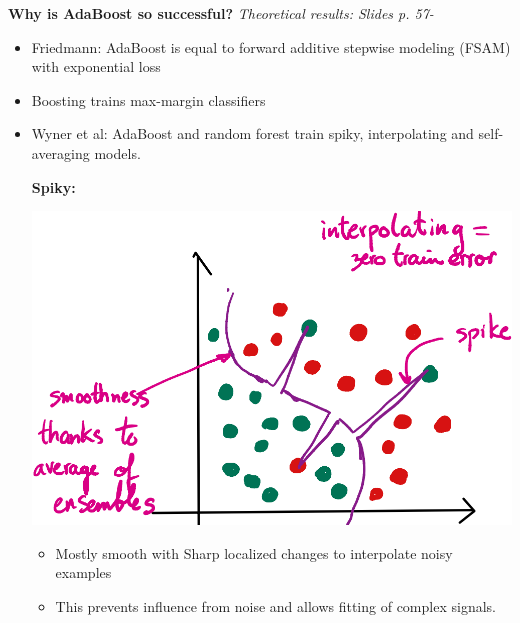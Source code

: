\textbf{Why is AdaBoost so successful?}
\textit{Theoretical results: Slides p. 57-}
\begin{itemize}
	\item Friedmann: AdaBoost is equal to forward additive stepwise modeling (FSAM) with exponential loss
		\item Boosting trains max-margin classifiers
	\item Wyner et al: AdaBoost and random forest train spiky, interpolating and self-averaging models.
	
	\begin{minipage}{0.35\columnwidth}
	\textbf{Spiky: }
	\begin{center}
		\includegraphics[width=\columnwidth]{images/9-adaboost-spiky}
	\end{center}
	\end{minipage}
	\begin{minipage}{0.55\columnwidth}
		\begin{itemize}
			\item Mostly smooth with Sharp localized changes to interpolate noisy examples
			\item This prevents influence from noise and allows fitting of complex signals.
		\end{itemize}
	\end{minipage}
	

\end{itemize}
